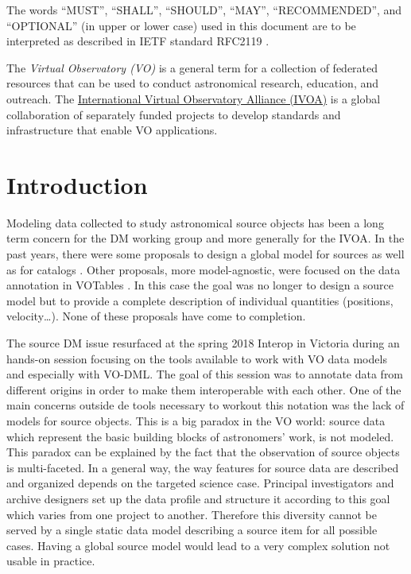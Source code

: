 \documentclass[11pt,a4paper]{ivoa}
\begin{document}
The words ``MUST'', ``SHALL'', ``SHOULD'', ``MAY'', ``RECOMMENDED'', and
``OPTIONAL'' (in upper or lower case) used in this document are to be
interpreted as described in IETF standard RFC2119 \citep{std:RFC2119}.

The \emph{Virtual Observatory (VO)} is a
general term for a collection of federated resources that can be used
to conduct astronomical research, education, and outreach.
The \href{http://www.ivoa.net}{International
Virtual Observatory Alliance (IVOA)} is a global
collaboration of separately funded projects to develop standards and
infrastructure that enable VO applications.


\section{Introduction}

Modeling data collected to study astronomical source objects has been a long term concern for the DM working group and more generally for the IVOA.
In the past years, there were some proposals to design a global model for sources \citep{wd:jesusdm} as well as for catalogs \citep{wd:catalog}.
Other proposals, more model-agnostic, were focused on the data annotation in VOTables \citep{note:stcvot} \citep{note:seb}. In this case the goal was no longer to design a source model but to provide a complete description of  individual quantities (positions, velocity…).
None of these proposals have come to completion.

The source DM issue resurfaced at the spring 2018 Interop in Victoria during an hands-on session focusing on the tools available to work with VO data models and especially with VO-DML. The goal of this session was to annotate data from different origins in order to make them interoperable with each other.
One of the main concerns outside de tools necessary to workout this notation was the lack of models for source objects.
This is a big paradox in the VO world: source data which represent the basic building blocks of astronomers' work, is not modeled. This paradox can be explained by the fact that the observation of source objects is multi-faceted.
In a general way, the way features for source data are described and organized depends on the targeted science case. Principal investigators and archive designers set up the data profile and structure it according to this goal which varies from one project to another. Therefore this diversity cannot be served by a single static data model describing a source item for all possible cases.
Having a global source model would lead to a very complex solution not usable in practice.
\end{document}
